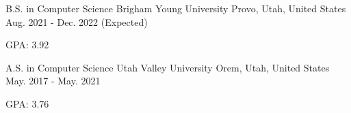 

\begin{cventries}

  \cventry
    {B.S. in Computer Science} %
    {Brigham Young University} %
    {Provo, Utah, United States} %
    {Aug. 2021 - Dec. 2022 (Expected)} %
    {
      \begin{cvitems} %
        \item {GPA: 3.92}
      \end{cvitems}
    }
  
  \cventry
    {A.S. in Computer Science} %
    {Utah Valley University} %
    {Orem, Utah, United States} %
    {May. 2017 - May. 2021} %
    {
      \begin{cvitems} %
        \item {GPA: 3.76}
      \end{cvitems}
    }

\end{cventries}
